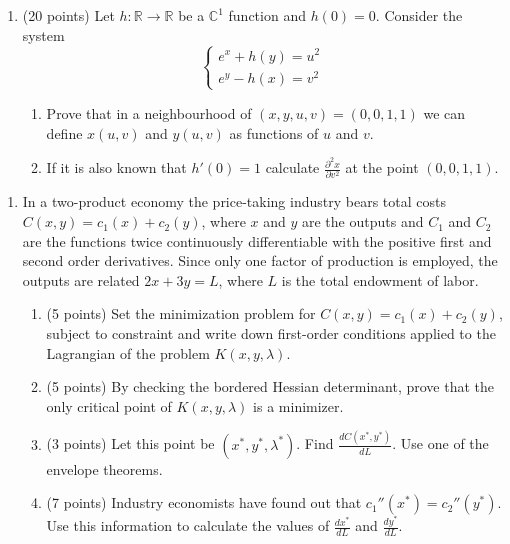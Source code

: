 \begin{enumerate}[resume]
  \item (20 points) Let $h: \mathbb{R} \to \mathbb{R}$ be a $\mathbb{C}^1$ function and $h(0)=0$. Consider the system
\[
  \begin{cases}
    e^x+h(y)=u^2\\
    e^y-h(x)=v^2
  \end{cases}   
\]
          \begin{enumerate} 
              \item Prove that in a neighbourhood of $(x,y,u,v)=(0,0,1,1)$ we can define $x(u,v)$ and $y(u,v)$ as functions of $u$ and $v$.
              \item If it is also known that $h'(0)=1$ calculate $\frac{\partial ^2 x}{\partial v^2}$ at the point $(0,0,1,1)$.
          \end{enumerate}
\end{enumerate}

\begin{enumerate}[resume]
      \item  In a two-product economy the price-taking industry bears total costs $C(x,y)=c_1(x)+c_2(y)$, 
      where $x$  and $y$  are the outputs and $C_1$ and $C_2$ are the functions twice continuously differentiable with the positive first and second order derivatives. 
      Since only one factor of production is employed, the outputs are related $2x+3y=L$, 
      where $L$  is the total endowment of labor.
          \begin{enumerate}
              \item (5 points) Set the minimization problem for $C(x,y)=c_1(x)+c_2(y)$, 
              subject to constraint and write down first-order conditions applied to the Lagrangian of the problem $K(x,y,\lambda)$.
             \item (5 points) By checking the bordered Hessian determinant, 
             prove that the only critical point of $K(x,y,\lambda)$ is a minimizer.
              \item(3 points) Let this point be $(x^*,y^*,\lambda^*)$. 
              Find $\frac{dC(x^*,y^*)}{dL}$. Use one of the envelope theorems.
              \item(7 points) Industry economists have found out that $c_1''(x^*)=c_2''(y^*)$. 
              Use this information to calculate the values of $\frac{dx^*}{dL}$ and $\frac{dy^*}{dL}$.
          \end{enumerate}
  \end{enumerate}
  

